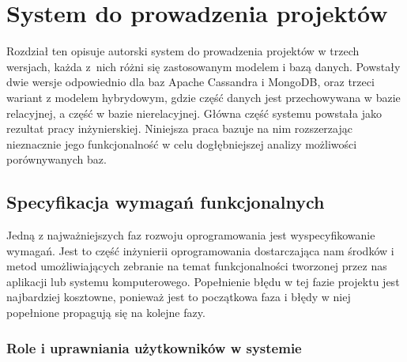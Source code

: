 \chapter{System do prowadzenia projektów}

Rozdział ten opisuje autorski system do prowadzenia projektów w trzech wersjach, każda z~nich różni się zastosowanym modelem i bazą danych.
Powstały dwie wersje odpowiednio dla baz Apache Cassandra i MongoDB, oraz trzeci wariant z modelem hybrydowym, gdzie część danych jest przechowywana w bazie relacyjnej, a część w bazie nierelacyjnej.
Główna część systemu powstała jako rezultat pracy inżynierskiej.
Niniejsza praca bazuje na nim rozszerzając nieznacznie jego funkcjonalność w celu dogłębniejszej analizy możliwości porównywanych baz.

\section{Specyfikacja wymagań funkcjonalnych}

Jedną z najważniejszych faz rozwoju oprogramowania jest wyspecyfikowanie wymagań.
Jest to część inżynierii oprogramowania dostarczająca nam środków i metod umożliwiających zebranie na temat funkcjonalności tworzonej przez nas aplikacji lub systemu komputerowego.
Popełnienie błędu w tej fazie projektu jest najbardziej kosztowne, ponieważ jest to początkowa faza i błędy w niej popełnione propagują się na kolejne fazy.

\subsection*{Role i uprawniania użytkowników w systemie}

